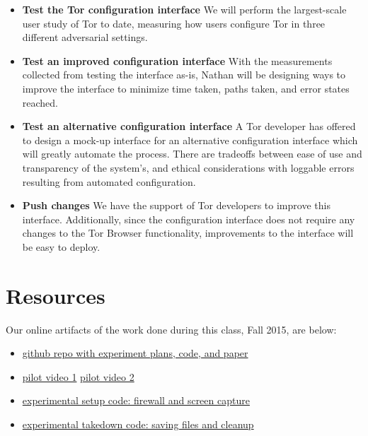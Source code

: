 \documentclass{template}
\begin{document}
\begin{itemize} \itemsep1pt \parskip0pt 
\item {\bfseries Test the Tor configuration interface} We will perform the largest-scale user study 
of Tor to date, measuring how users configure Tor in three different adversarial settings. 
\item {\bfseries Test an improved configuration interface} With the measurements collected
from testing the interface as-is, Nathan will be designing ways to improve the interface to minimize
time taken, paths taken, and error states reached.
\item {\bfseries Test an alternative configuration interface} A Tor developer has offered
to design a mock-up interface for an alternative configuration interface which will
greatly automate the process. There are tradeoffs between ease of use and transparency
of the system's, and ethical considerations with loggable errors resulting from automated configuration. 
\item {\bfseries Push changes} We have the support of Tor developers
to improve this interface. Additionally, since the configuration interface does not require 
any changes to the Tor Browser functionality, improvements to the interface will
be easy to deploy. 
\end{itemize}

\section{Resources}
\noindent Our online artifacts of the work done during this class, Fall 2015,
are below: 
\begin{itemize} \itemsep1pt \parskip0pt 
\item \href{https://github.com/lindanlee/circumvention-ux-tor}{github repo with experiment plans, code, and paper}
\item \href {https://github.com/lindanlee/circumvention-ux-tor/blob/master/pilot/1-strict.mp4}{pilot video 1}
	\href{https://github.com/lindanlee/circumvention-ux-tor/blob/master/pilot/2-lax.mp4}{pilot video 2}
\item \href{https://github.com/lindanlee/circumvention-ux-tor/blob/master/setup/setup-environment}{experimental setup code: firewall and screen capture} 
\item \href{https://github.com/lindanlee/circumvention-ux-tor/blob/master/setup/takedown-environment}{experimental takedown code: saving files and cleanup} 
\end{itemize}
\end{document}
